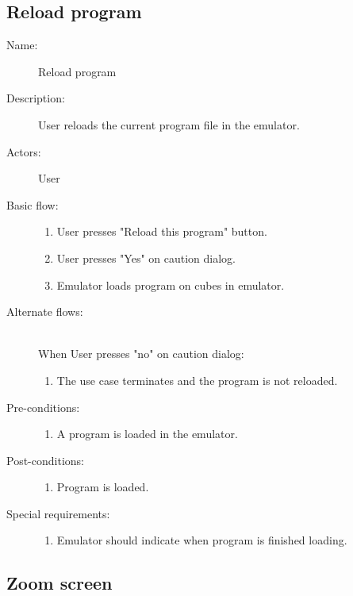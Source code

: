 \documentclass[12pt]{article}
\begin{document}
  \subsection{Reload program}

    \begin{description}
      \item[Name:] Reload program
      \item[Description:] User reloads the current program file in the emulator.
      \item[Actors:] User
      \item[Basic flow:] \hfill
        \begin{enumerate}
	  \item{User presses "Reload this program" button.}
	  \item{User presses "Yes" on caution dialog.}
	  \item{Emulator loads program on cubes in emulator.}
        \end{enumerate}
      \item[Alternate flows:] \hfill \\
	When User presses "no" on caution dialog:
        \begin{enumerate}
          \item{The use case terminates and the program is not reloaded.}
        \end{enumerate}
      \item[Pre-conditions:] \hfill
        \begin{enumerate}
	  \item{A program is loaded in the emulator.}
        \end{enumerate}
      \item[Post-conditions:] \hfill
        \begin{enumerate}
	  \item{Program is loaded.}
        \end{enumerate}
      \item[Special requirements:] \hfill
        \begin{enumerate}
	  \item{Emulator should indicate when program is finished loading.}
        \end{enumerate}
    \end{description}

  \subsection{Zoom screen}
\end{document}
